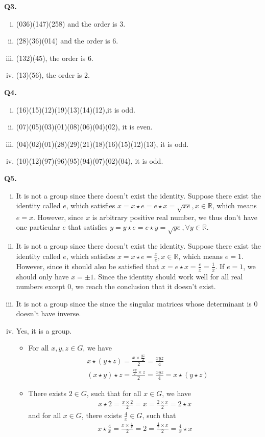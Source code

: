 \documentclass{article}[12pt]
\begin{document}
\noindent \textbf{Q3.}
\begin{enumerate}[(i)]
\item (036)(147)(258) and the order is 3.
\item (28)(36)(014) and the order is 6.
\item (132)(45), the order is 6.
\item (13)(56), the order is 2.
\end{enumerate}


\noindent \textbf{Q4.}
\begin{enumerate}[(i)]
\item (16)(15)(12)(19)(13)(14)(12),it is odd.
\item (07)(05)(03)(01)(08)(06)(04)(02), it is even.
\item (04)(02)(01)(28)(29)(21)(18)(16)(15)(12)(13), it is odd.
\item (10)(12)(97)(96)(95)(94)(07)(02)(04), it is odd.
\end{enumerate}



\noindent \textbf{Q5.}
\begin{enumerate}[(i)]
\item It is not a group since there doesn't exist the identity. Suppose there exist the identity called $e$, which satisfies $x=x\star e=e\star x=\sqrt{xe}, x\in \mathbb{R}$, which means $e=x$. However, since $x$ is arbitrary positive real number, we thus don't have one particular $e$ that satisfies $y=y\star e=e\star y=\sqrt{ye}, \forall y\in \mathbb{R}$.
\item It is not a group since there doesn't exist the identity. Suppose there exist the identity called $e$, which satisfies $x=x\star e=\frac{x}{e}, x\in \mathbb{R}$, which means $e=1$. However, since it should also be satisfied that $x=e\star x=\frac{e}{x}=\frac{1}{x}$. If $e=1$, we should only have $x=\pm 1$. Since the identity should work well for all real numbers except 0, we reach the conclusion that it doesn't exist.
\item It is not a group since the since the singular matrices whose determinant is 0 doesn't have inverse. 
\item Yes, it is a group.
\begin{itemize}
\item For all $x,y,z\in G$, we have 
\begin{align*}
&x\star (y\star z)= \frac{x\times \frac{yz}{2}}{2}=\frac{xyz}{4}\\
&(x\star y)\star z=\frac{\frac{xy}{2}\times z}{2}=\frac{xyz}{4}=x\star (y\star z)
\end{align*}
\item There exists $2\in G$, such that for all $x\in G$, we have 
\begin{align*}
x\star 2=\frac{x\times 2}{2}=x=\frac{2\times x}{2}=2\star x
\end{align*}
and for all $x\in G$, there exists $\frac{4}{x}\in G$, such that 
\begin{align*}
x\star \frac{4}{x}=\frac{x\times \frac{4}{x}}{2}=2=\frac{\frac{4}{x}\times x}{2}=\frac{4}{x}\star x
\end{align*}
\end{itemize}
\end{enumerate}
\end{document}
